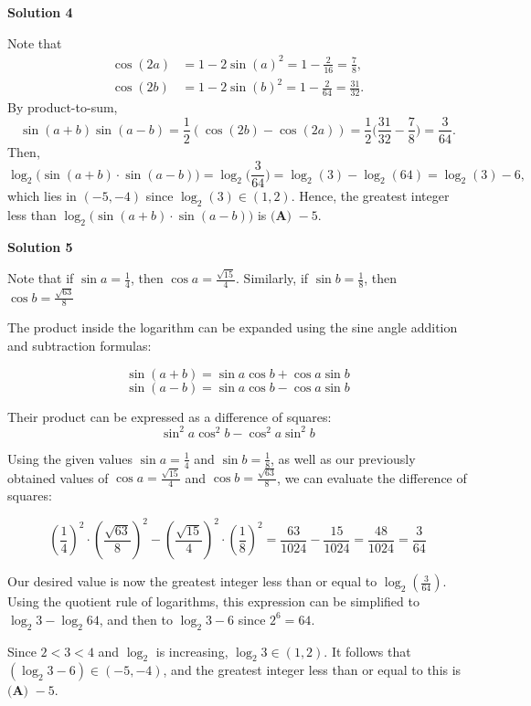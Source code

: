 \begin{enumerate}
 



\textbf{Solution 4}

Note that
 \begin{align*} \cos(2a) &= 1 - 2\sin(a)^2 = 1 - \frac{2}{16} = \frac{7}{8}, \\ \cos(2b) &= 1 - 2\sin(b)^2 = 1 - \frac{2}{64} = \frac{31}{32}. \end{align*}
By product-to-sum,
 \[\sin(a + b)\sin(a - b) = \frac{1}{2}(\cos(2b) - \cos(2a)) = \frac{1}{2}\biggl(\frac{31}{32} - \frac{7}{8}\biggr) = \frac{3}{64}.\]Then,
 \[\log_2\bigl(\sin(a + b) \cdot \sin(a - b)\bigr) = \log_2\biggl(\frac{3}{64}\biggr) = \log_2(3) - \log_2(64) = \log_2(3) - 6,\]which lies in $(-5, -4)$ since $\log_2(3) \in (1, 2)$. Hence, the greatest integer less than $\log_2\bigl(\sin(a + b) \cdot \sin(a - b)\bigr)$ is $\boxed{\textbf{(A) }-5}$.

 



\textbf{Solution 5}

Note that if $\sin a = \frac{1}{4}$, then $\cos a = \frac{\sqrt{15}}{4}$. Similarly, if $\sin b = \frac{1}{8}$, then $\cos b = \frac{\sqrt{63}}{8}$

 The product inside the logarithm can be expanded using the sine angle addition and subtraction formulas:

 
 \[\sin(a + b) = \sin a \cos b + \cos a \sin b\]
 \[\sin(a - b) = \sin a \cos b - \cos a \sin b\]

 Their product can be expressed as a difference of squares: 
 \[\sin^2 a \cos^2 b - \cos^2 a \sin^2 b\]

 Using the given values $\sin a = \frac{1}{4}$ and $\sin b = \frac{1}{8}$, as well as our previously obtained values of $\cos a = \frac{\sqrt{15}}{4}$ and $\cos b = \frac{\sqrt{63}}{8}$, we can evaluate the difference of squares:

 
 \[\left(\frac{1}{4}\right)^2 \cdot \left(\frac{\sqrt{63}}{8}\right)^2 - \left(\frac{\sqrt{15}}{4}\right)^2 \cdot \left(\frac{1}{8}\right)^2 = \frac{63}{1024} - \frac{15}{1024} = \frac{48}{1024} = \frac{3}{64}\]

 Our desired value is now the greatest integer less than or equal to $\log_2 \left( \frac{3}{64} \right)$. Using the quotient rule of logarithms, this expression can be simplified to $\log_2 3 - \log_2 64$, and then to $\log_2 3 - 6$ since $2^6 = 64$. 

 Since $2 < 3 < 4$ and $\log_2$ is increasing, $\log_2 3 \in (1, 2)$. It follows that $(\log_2 3 - 6) \in (-5, -4)$, and the greatest integer less than or equal to this is $\boxed{\textbf{(A) }-5}$.


\end{enumerate}
